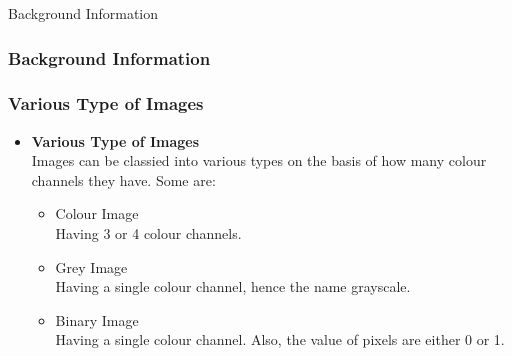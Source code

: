 \documentclass{beamer}
\begin{document}
\begin{frame}{Background Information}
    \frametitle{Background Information}
    \subsubsection{Various Type of Images}
    \begin{itemize}
        \item <1-> \textbf{Various Type of Images}\\
              Images can be classied into various types on the basis of how many colour channels they have. Some are:
              \begin{itemize}
                  \item <2-> Colour Image\\
                        Having 3 or 4 colour channels.
                  \item <3-> Grey Image\\
                        Having a single colour channel, hence the name grayscale.
                  \item <4-> Binary Image\\
                        Having a single colour channel. Also, the value of pixels are either 0 or 1.
              \end{itemize}
    \end{itemize}
\end{frame}
\end{document}
